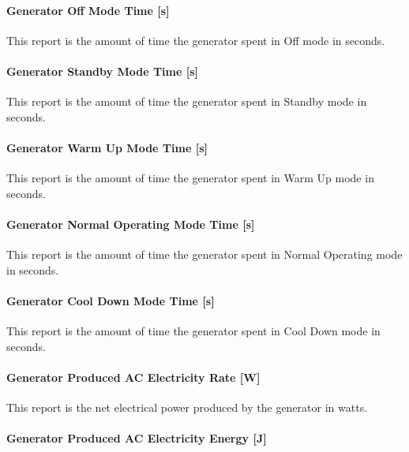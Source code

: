 \paragraph{Generator Off Mode Time {[}s{]}}\label{generator-off-mode-time-s}

This report is the amount of time the generator spent in Off mode in seconds.

\paragraph{Generator Standby Mode Time {[}s{]}}\label{generator-standby-mode-time-s}

This report is the amount of time the generator spent in Standby mode in seconds.

\paragraph{Generator Warm Up Mode Time {[}s{]}}\label{generator-warm-up-mode-time-s}

This report is the amount of time the generator spent in Warm Up mode in seconds.

\paragraph{Generator Normal Operating Mode Time {[}s{]}}\label{generator-normal-operating-mode-time-s}

This report is the amount of time the generator spent in Normal Operating mode in seconds.

\paragraph{Generator Cool Down Mode Time {[}s{]}}\label{generator-cool-down-mode-time-s}

This report is the amount of time the generator spent in Cool Down mode in seconds.

\paragraph{Generator Produced AC Electricity Rate {[}W{]}}\label{generator-produced-electric-power-w-2}

This report is the net electrical power produced by the generator in watts.

\paragraph{Generator Produced AC Electricity Energy {[}J{]}}\label{generator-produced-electric-energy-j-2}

